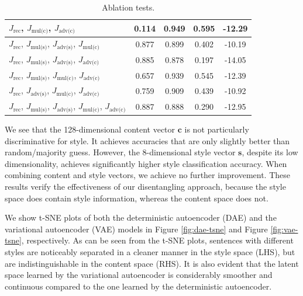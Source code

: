 \documentclass[letterpaper]{article} %
\newcommand{\loss}[1]{J_{\text{#1}}}
\begin{document}
\begin{table}[ht]
\begin{tabular}{| l || c | c | c | c |}
		\hline
		$\loss{rec}$, $\loss{mul(c)}$, $\loss{adv(c)}$                                   & 0.114           & 0.949             & 0.595          & -12.29          \\
		\hline
		$\loss{rec}$, $\loss{mul(s)}$, $\loss{adv(s)}$, $\loss{mul(c)}$                  & 0.877           & 0.899             & 0.402          & -10.19          \\
		\hline
		$\loss{rec}$, $\loss{mul(s)}$, $\loss{adv(s)}$, $\loss{adv(c)}$                  & 0.885           & 0.878             & 0.197          & -14.05          \\
		\hline
		$\loss{rec}$, $\loss{mul(s)}$, $\loss{mul(c)}$, $\loss{adv(c)}$                  & 0.657           & 0.939             & 0.545          & -12.39          \\
		\hline
		$\loss{rec}$, $\loss{adv(s)}$, $\loss{mul(c)}$, $\loss{adv(c)}$                  & 0.759           & 0.909             & 0.439          & -10.92          \\
		\hline
		$\loss{rec}$, $\loss{mul(s)}$, $\loss{adv(s)}$, $\loss{mul(c)}$, $\loss{adv(c)}$ & 0.887           & 0.888             & 0.290          & -12.95          \\
		\hline
	\end{tabular}
	\caption{Ablation tests.}
	\label{tab:ablation-results}
\end{table}

We see that the 128-dimensional content vector $\bm c$ is not particularly discriminative for style.
It achieves accuracies that are only slightly better than random/majority guess.
However, the 8-dimensional style vector $\bm s$, despite its low dimensionality, achieves significantly higher style classification accuracy.
When combining content and style vectors, we achieve no further improvement.
These results verify the effectiveness of our disentangling approach, because the style space does contain style information, whereas the content space does not.

We show t-SNE plots of both the deterministic autoencoder (DAE) and the variational autoencoder (VAE) models in Figure \ref{fig:dae-tsne} and Figure \ref{fig:vae-tsne}, respectively.
As can be seen from the t-SNE plots, sentences with different styles are noticeably separated in a cleaner manner in the style space (LHS), but are indistinguishable in the content space (RHS).
It is also evident that the latent space learned by the variational autoencoder is considerably smoother and continuous compared to the one learned by the deterministic autoencoder.
\end{document}
